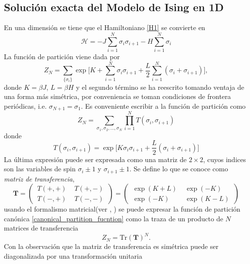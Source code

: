\documentclass[a4paper]{article}
\begin{document}
\subsection{Solución exacta del Modelo de Ising en 1D}
En una dimensión se tiene que el Hamiltoniano \ref{H1} se convierte en 
\begin{equation}
\mathcal{H}=-J\sum_{i=1}^{N}\sigma_i\sigma_{i+1}-H\sum_{i=1}^{N}\sigma_i
\end{equation}
La función de partición viene dada por 
\begin{equation}
Z_N=\sum_{\{\sigma_i \}}\exp\Bigg[ K+\sum_{i=1}^{N}\sigma_i\sigma_{i+1}+\frac{L}{2}\sum_{i=1}^{N}(\sigma_i+\sigma_{i+1}) \Bigg],
\end{equation}
donde $K=\beta J$, $L=\beta H$ y el segundo término se ha reescrito tomando ventaja de una forma más simétrica, por conveniencia se toman condiciones de frontera periódicas, i.e. $\sigma_{N+1}=\sigma_1$. Es conveniente escribir a la función de partición como 
\begin{equation}\label{canonical_partition_fucntion}
Z_N=\sum_{\sigma_1,\sigma_2,\hdots,\sigma_N}\prod^N_{i=1}T(\sigma_i, \sigma_{i+1})
\end{equation}
donde
\begin{equation}
T(\sigma_i,\sigma_{i+1})=\exp \Big[  K\sigma_i\sigma_{i+1}+\frac{L}{2}(\sigma_i+\sigma_{i+1}) \Big]
\end{equation}
La última expresión puede ser expresada como una matriz de $2\times 2$, cuyos indices son las variables de spin $\sigma_i\pm 1$ y $\sigma_{i+1}\pm 1$. Se define lo que se conoce como \textit{matriz de transferencia},
\begin{equation}
\mathbf{T}=
\begin{pmatrix}
\,T(+,+)\, &\, T(+,-)\,\\
\,T(-,+)\, &\, T(-,-)\,
\end{pmatrix}=
\begin{pmatrix}
\,\exp(K+L)\, &\,\exp(-K)\,\\
\,\exp(-K)\, &\, \exp(K-L)\,
\end{pmatrix}
\end{equation}
usando el formalismo matricial(ver \cite{Salinas}, \cite{Pathria}) se puede expresar la función de partición canónica \ref{canonical_partition_fucntion} como la traza de un producto de $N$ matrices de transferencia
\begin{equation}
Z_N=\text{Tr}(\mathbf{T})^N.
\end{equation}
Con la observación que la matriz de transferencia es simétrica puede ser diagonalizada por una transformación unitaria
\end{document}
